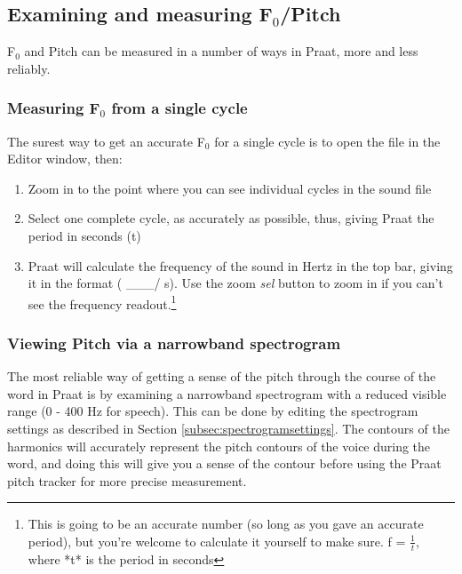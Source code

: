 \hypertarget{examining-and-measuring-f0pitch}{%
\subsection{Examining and measuring
F$_{0}$/Pitch}\label{examining-and-measuring-f0pitch}}

F$_{0}$ and Pitch can be measured in a number of ways in Praat, more and less
reliably.

\hypertarget{measuring-f0-from-a-single-cycle}{%
\subsubsection{Measuring F$_{0}$ from a single
cycle}\label{measuring-f0-from-a-single-cycle}}

The surest way to get an accurate F$_{0}$ for a single cycle is to open the
file in the Editor window, then:

\begin{enumerate}
\def\labelenumi{\arabic{enumi}.}
\tightlist
\item
  Zoom in to the point where you can see individual cycles in the sound
  file
\item
  Select one complete cycle, as accurately as possible, thus, giving
  Praat the period in seconds (t)
\item
  Praat will calculate the frequency of the sound in Hertz in the top
  bar, giving it in the format ( \_\_\_/ s). Use the zoom \emph{sel}
  button to zoom in if you can't see the frequency
  readout.\footnote{This is going to be an accurate number (so long as you gave an accurate period), but you’re welcome to calculate it yourself to make sure.  f = $\frac{1}{t}$, where *t* is the period in seconds}
\end{enumerate}

\hypertarget{viewing-pitch-via-a-narrowband-spectrogram}{%
\subsubsection{Viewing Pitch via a narrowband
spectrogram}\label{viewing-pitch-via-a-narrowband-spectrogram}}

The most reliable way of getting a sense of the pitch through the course
of the word in Praat is by examining a narrowband spectrogram with a
reduced visible range (0 - 400 Hz for speech). This can be done by
editing the spectrogram settings as described in Section
\ref{subsec:spectrogramsettings}. The contours of the harmonics will
accurately represent the pitch contours of the voice during the word,
and doing this will give you a sense of the contour before using the
Praat pitch tracker for more precise measurement.

